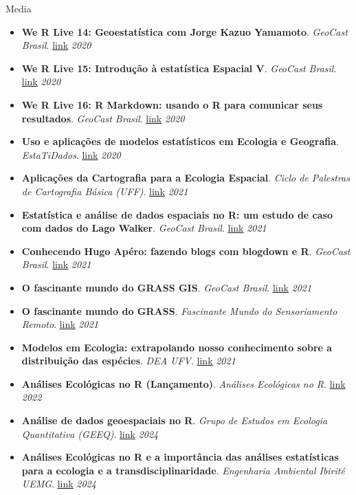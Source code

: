 \documentclass{resume}
\begin{document}
\begin{rSection}{Media}
\begin{itemize}
\item \textbf{We R Live 14: Geoestatística com Jorge Kazuo Yamamoto}. \textit{GeoCast Brasil}. \href{https://youtu.be/BvURukaIDM0}{\underline{link}} \hfill{\em 2020}
\item \textbf{We R Live 15: Introdução à estatística Espacial V}. \textit{GeoCast Brasil}. \href{https://youtu.be/IeGTr7mjZIc}{\underline{link}} \hfill{\em 2020}
\item \textbf{We R Live 16: R Markdown: usando o R para comunicar seus resultados}. \textit{GeoCast Brasil}. \href{https://youtu.be/6oPZ5sGt6LA}{\underline{link}} \hfill{\em 2020}
\item \textbf{Uso e aplicações de modelos estatísticos em Ecologia e Geografia}. \textit{EstaTiDados}. \href{https://youtu.be/pUavO7dVRGk}{\underline{link}} \hfill{\em 2020}
\item \textbf{Aplicações da Cartografia para a Ecologia Espacial}. \textit{Ciclo de Palestras de Cartografia Básica (UFF)}. \href{https://youtu.be/csh1BPH_H8I}{\underline{link}} \hfill{\em 2021}
\item \textbf{Estatística e análise de dados espaciais no R: um estudo de caso com dados do Lago Walker}. \textit{GeoCast Brasil}. \href{https://youtu.be/csh1BPH_H8I}{\underline{link}} \hfill{\em 2021}
\item \textbf{Conhecendo Hugo Apéro: fazendo blogs com blogdown e R}. \textit{GeoCast Brasil}. \href{https://youtu.be/4Ixl2RjZEYI}{\underline{link}} \hfill{\em 2021}
\item \textbf{O fascinante mundo do GRASS GIS}. \textit{GeoCast Brasil}. \href{https://youtu.be/_pohWjE4eiA}{\underline{link}} \hfill{\em 2021}
\item \textbf{O fascinante mundo do GRASS}. \textit{Fascinante Mundo do Sensoriamento Remoto}. \href{https://youtu.be/vp6frd89y9E}{\underline{link}} \hfill{\em 2021}
\item \textbf{Modelos em Ecologia: extrapolando nosso conhecimento sobre a distribuição das espécies}. \textit{DEA UFV}. \href{https://youtu.be/Kcc-eIhqtlE}{\underline{link}} \hfill{\em 2021}
\item \textbf{Análises Ecológicas no R (Lançamento)}. \textit{Análises Ecológicas no R}. \href{https://youtu.be/jYrneB95nes}{\underline{link}} \hfill{\em 2022}
\item \textbf{Análise de dados geoespaciais no R}. \textit{Grupo de Estudos em Ecologia Quantitativa (GEEQ)}. \href{https://youtu.be/qySBvCu7IS0}{\underline{link}} \hfill{\em 2024}	
\item \textbf{Análises Ecológicas no R e a importância das análises estatísticas para a ecologia e a transdisciplinaridade}. \textit{Engenharia Ambiental Ibirité UEMG}. \href{https://www.youtube.com/watch?v=NWfJ5G2w8ME}{\underline{link}} \hfill{\em 2024}
\end{itemize} 


\end{rSection}
\end{document}
